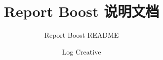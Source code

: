 \endofdump
{}

    \title{Report Boost 说明文档}
    \subtitle{Report Boost README}
    \author{Log Creative}
    \maketitle
